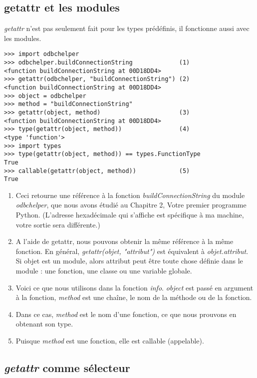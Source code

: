 \subsection{getattr et les modules}

\emph{getattr} n’est pas seulement fait pour les types prédéfinis, il fonctionne aussi avec les modules.

\begin{example}
\begin{lstlisting}
>>> import odbchelper
>>> odbchelper.buildConnectionString             (1)
<function buildConnectionString at 00D18DD4>
>>> getattr(odbchelper, "buildConnectionString") (2)
<function buildConnectionString at 00D18DD4>
>>> object = odbchelper
>>> method = "buildConnectionString"
>>> getattr(object, method)                      (3)
<function buildConnectionString at 00D18DD4>
>>> type(getattr(object, method))                (4)
<type 'function'>
>>> import types
>>> type(getattr(object, method)) == types.FunctionType
True
>>> callable(getattr(object, method))            (5)
True
\end{lstlisting}
\end{example}

\begin{enumerate}
    \item{Ceci retourne une référence à la fonction \emph{buildConnectionString} du module \emph{odbchelper}, que nous avons étudié au Chapitre 2, Votre premier programme Python. (L’adresse hexadécimale qui s’affiche est spécifique à ma machine, votre sortie sera différente.)}
    \item{A l’aide de getattr, nous pouvons obtenir la même référence à la même fonction. En général, \emph{getattr(objet, "attribut")} est équivalent à
    \emph{objet.attribut}. Si objet est un module, alors attribut peut être toute
    chose définie dans le module : une fonction, une classe ou une variable
    globale.}
    \item{Voici ce que nous utilisons dans la fonction \emph{info}. \emph{object} est passé en argument à la fonction, \emph{method} est une chaîne, le nom de la méthode ou de la fonction.}
    \item{Dans ce cas, \emph{method} est le nom d’une fonction, ce que nous prouvons en obtenant son type.}
    \item{Puisque \emph{method} est une fonction, elle est callable (appelable).}
\end{enumerate}

\subsection{\emph{getattr} comme sélecteur}

